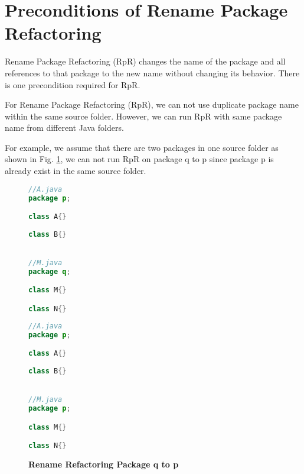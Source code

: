 \section{\textbf{Preconditions of Rename Package Refactoring}}
Rename Package Refactoring (RpR) changes the name of the package and all references to that package to the new name without changing its behavior. There is one precondition required for RpR.

For Rename Package Refactoring (RpR), we can not use duplicate package name within the same source folder. However, we can run RpR with same package name from different Java folders.

For example, we assume that there are two packages in one source folder as shown in Fig. \ref{fig:RpR}, we can not run RpR on package q to p since package p is already exist in the same source folder. 

\begin{figure}[th]
\centering
\begin{minipage}[t]{0.45\linewidth}
\begin{lstlisting}[language=java, basicstyle=\scriptsize\ttfamily,frame=single]
//A.java
package p;

class A{}
	
class B{}


//M.java
package q;

class M{}	

class N{}
\end{lstlisting}
\end{minipage}
\hfill
\begin{minipage}[t]{0.45\linewidth}
\begin{lstlisting}[language=java, basicstyle=\scriptsize\ttfamily,frame=single]
//A.java
package p;

class A{}
	
class B{}


//M.java
package p;

class M{}	

class N{}


\end{lstlisting}
\end{minipage}
\caption{\textbf{Rename Refactoring Package q to p}}
\label{fig:RpR}
\end{figure}
